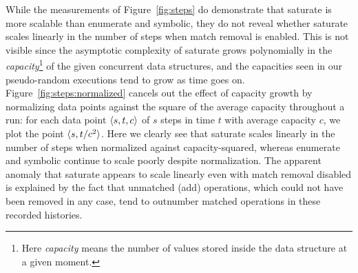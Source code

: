 While the measurements of Figure~\ref{fig:steps} do demonstrate that {\sc
saturate} is more scalable than {\sc enumerate} and {\sc symbolic}, they do not
reveal whether {\sc saturate} scales linearly in the number of steps when match
removal is enabled. This is not visible since the asymptotic complexity of {\sc
saturate} grows polynomially in the \emph{capacity}\footnote{Here
\emph{capacity} means the number of values stored inside the data structure at
a given moment.} of the given concurrent data structures, and the capacities
seen in our pseudo-random executions tend to grow as time goes on.
Figure~\ref{fig:steps:normalized} cancels out the effect of capacity growth by
normalizing data points against the square of the average capacity throughout a
run: for each data point ${\langle{s,t,c}\rangle}$ of $s$ steps in time $t$ with average
capacity $c$, we plot the point ${\langle{s,t/c^2}\rangle}$. Here we clearly see that {\sc
saturate} scales linearly in the number of steps when normalized against
capacity-squared, whereas {\sc enumerate} and {\sc symbolic} continue to scale
poorly despite normalization. The apparent anomaly that {\sc saturate} appears
to scale linearly even with match removal disabled is explained by the fact that
unmatched (add) operations, which could not have been removed in any case, tend
to outnumber matched operations in these recorded histories.

